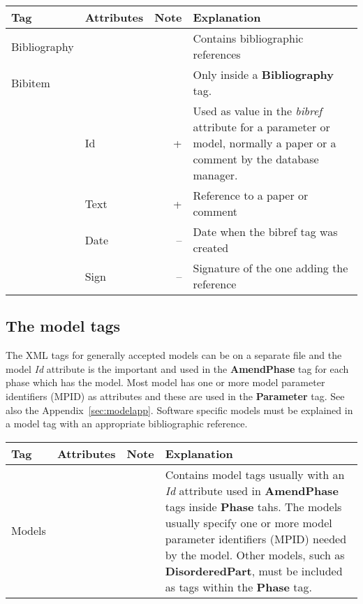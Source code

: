 \documentclass{article}
\begin{document}
\bigskip
\begin{tabular}{|p{} p{} r p{}|}\hline
  Tag & Attributes & Note & Explanation\\\hline

  Bibliography & && Contains bibliographic references\\\hline

  Bibitem & && Only inside a {\bf Bibliography} tag.\\
      & Id & + &   Used as value in the {\em bibref} attribute for a parameter
            or model, normally a paper or a comment by the database manager.\\
      & Text & + & Reference to a paper or comment\\
      & Date & -- & Date when the bibref tag was created\\
      & Sign & -- & Signature of the one adding the reference\\\hline

\end{tabular}

\newpage 

\subsection{The model tags}\label{sec:models}

The XML tags for generally accepted models can be on a separate file
and the model {\em Id} attribute is the important and used in the {\bf
  AmendPhase} tag for each phase which has the model.  Most model has
one or more model parameter identifiers (MPID) as attributes and these
are used in the {\bf Parameter} tag.  See also the
Appendix~\ref{sec:modelapp}.  Software specific models must be
explained in a model tag with an appropriate bibliographic reference.

\bigskip
\begin{tabular}{|p{} p{} r p{}|}\hline
  Tag & Attributes & Note & Explanation\\\hline

  Models & && Contains model tags usually with an {\em Id} attribute
  used in {\bf AmendPhase} tags inside {\bf Phase} tahs.  The models
  usually specify one or more model parameter identifiers (MPID)
  needed by the model.  Other models, such as {\bf DisorderedPart},
  must be included as tags within the {\bf Phase} tag.\\\hline
\end{tabular}
\end{document}
